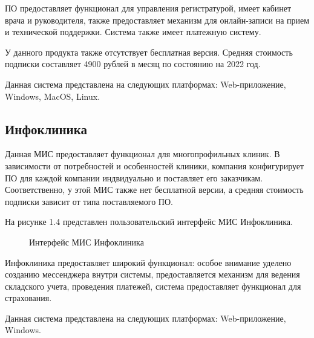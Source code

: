 ПО предоставляет функционал для управления регистратурой, имеет кабинет врача и руководителя, также предоставляет механизм для онлайн-записи на прием и технической поддержки. Система также имеет платежную систему. 

У данного продукта также отсутствует бесплатная версия. Средняя стоимость подписки составляет 4900 рублей в месяц по состоянию на 2022 год.

Данная система представлена на следующих платформах: Web-приложение, Windows, MacOS, Linux. 

\subsection*{Инфоклиника}

Данная МИС предоставляет функционал для многопрофильных клиник. В зависимости от потребностей и особенностей клиники, компания конфигурирует ПО для каждой компании индвидуально и поставляет его заказчикам. Соответственно, у этой МИС также нет бесплатной версии, а средняя стоимость подписки зависит от типа поставляемого ПО.

На рисунке 1.4 представлен пользовательский интерфейс МИС Инфоклиника.

\begin{figure}[!h]
	\caption{Интерфейс МИС Инфоклиника}
\end{figure}

Инфоклиника предоставляет широкий функционал: особое внимание уделено созданию мессенджера внутри системы, предоставляется механизм для ведения складского учета, проведения платежей, система предоставляет функционал для страхования.

Данная система представлена на следующих платформах: Web-приложение, Windows. 

